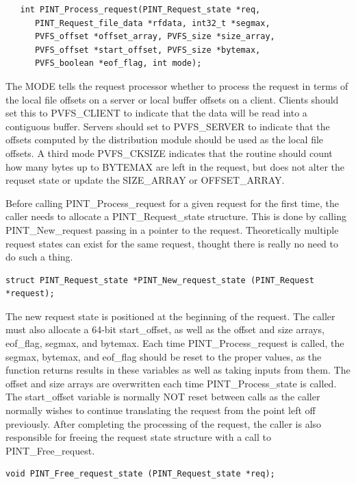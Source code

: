 \documentclass[12pt]{article} %
\begin{document}
\begin{verbatim}
   int PINT_Process_request(PINT_Request_state *req,
      PINT_Request_file_data *rfdata, int32_t *segmax,
      PVFS_offset *offset_array, PVFS_size *size_array,
      PVFS_offset *start_offset, PVFS_size *bytemax,
      PVFS_boolean *eof_flag, int mode);
\end{verbatim}

The MODE tells the request processor whether to process the
request in terms of the local file offsets on a server or local buffer
offsets on a client.  Clients should set this to PVFS\_CLIENT to
indicate that the data will be read into a contiguous buffer.  Servers
should set to PVFS\_SERVER to indicate that the offsets computed by the
distribution module should be used as the local file offsets.
A third mode PVFS\_CKSIZE indicates that the routine should count how
many bytes up to BYTEMAX are left in the request, but does not alter the
requset state or update the SIZE\_ARRAY or OFFSET\_ARRAY.

Before calling PINT\_Process\_request for a given request for the first
time, the caller needs to allocate a PINT\_Request\_state structure.
This is done by calling PINT\_New\_request passing in a pointer to the
request.  Theoretically multiple request states can exist for the same
request, thought there is really no need to do such a thing.

\begin{verbatim}
struct PINT_Request_state *PINT_New_request_state (PINT_Request *request);
\end{verbatim}

The new request state is positioned at the beginning of the request.
The caller must also allocate a 64-bit start\_offset, as well as
the offset and size arrays, eof\_flag, segmax, and bytemax.  Each time
PINT\_Process\_request is called, the segmax, bytemax, and eof\_flag
should be reset to the proper values, as the function returns results in
these variables as well as taking inputs from them.  The offset and size
arrays are overwritten each time PINT\_Process\_state is called.  The
start\_offset variable is normally NOT reset between calls as the
caller normally wishes to continue translating the request from the
point left off previously.  After completing the processing of the
request, the caller is also responsible for freeing the request state
structure with a call to PINT\_Free\_request.

\begin{verbatim}
void PINT_Free_request_state (PINT_Request_state *req);
\end{verbatim}
\end{document}
